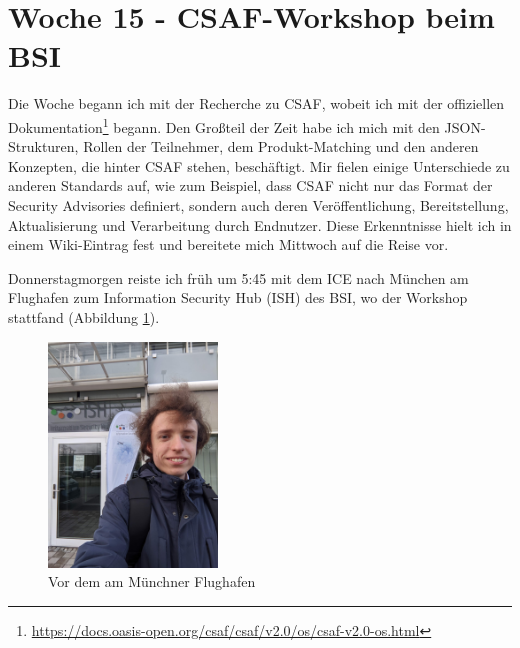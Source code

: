 \section{Woche 15 - CSAF-Workshop beim BSI} \label{sec:bericht-wo-15}


\lweekdaymarginpar{\weekdayMondayShort\ - \weekdayWednesdayShort}

Die Woche begann ich mit der Recherche zu CSAF, wobeit ich mit der offiziellen Dokumentation\footnote{\url{https://docs.oasis-open.org/csaf/csaf/v2.0/os/csaf-v2.0-os.html}} begann.
Den Großteil der Zeit habe ich mich mit den JSON-Strukturen, Rollen der Teilnehmer, dem Produkt-Matching und den anderen Konzepten, die hinter CSAF stehen, beschäftigt.
Mir fielen einige Unterschiede zu anderen Standards auf, wie zum Beispiel, dass CSAF nicht nur das Format der Security Advisories definiert, sondern auch deren Veröffentlichung, Bereitstellung, Aktualisierung und Verarbeitung durch Endnutzer.
Diese Erkenntnisse hielt ich in einem Wiki-Eintrag fest und bereitete mich Mittwoch auf die Reise vor.

\sweekdaymarginpar{\weekdayThursdayLong}

Donnerstagmorgen reiste ich früh um 5:45 mit dem ICE nach München am Flughafen zum Information Security Hub (ISH) des BSI, wo der Workshop stattfand (Abbildung \ref{fig:yan-ish-csaf-muenchen}).

\begin{figure}[htbp] %
    \centering
    \includegraphics[width=0.4\textwidth, keepaspectratio]{res/img/2023-12-14-yan-vor-dem-ish-muenchen}
    \caption{Vor dem  am Münchner Flughafen}
    \label{fig:yan-ish-csaf-muenchen}
\end{figure}

